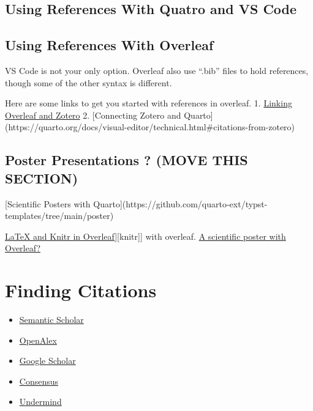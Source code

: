 \documentclass[
  letterpaper,
  DIV=11,
  numbers=noendperiod]{scrreprt}
\providecommand{\tightlist}{%
  \setlength{\itemsep}{0pt}\setlength{\parskip}{0pt}}\usepackage{longtable,booktabs,array}
\begin{document}
\section{Using References With Quatro and VS
Code}\label{using-references-with-quatro-and-vs-code}

\section{Using References With
Overleaf}\label{using-references-with-overleaf}

VS Code is not your only option. Overleaf also use ``.bib'' files to
hold references, though some of the other syntax is different.

Here are some links to get you started with references in overleaf. 1.
\href{https://www.overleaf.com/learn/how-to/How_to_link_your_Overleaf_account_to_Mendeley_and_Zotero}{Linking
Overleaf and Zotero} 2. {[}Connecting Zotero and
Quarto{]}(https://quarto.org/docs/visual-editor/technical.html\#citations-from-zotero)

\section{Poster Presentations ? (MOVE THIS
SECTION)}\label{poster-presentations-move-this-section}

{[}Scientific Posters with
Quarto{]}(https://github.com/quarto-ext/typst-templates/tree/main/poster)

\href{https://www.overleaf.com/learn/latex/Knitr}{LaTeX and Knitr in
Overleaf}{]}{[}knitr{]}{]} with overleaf.
\href{https://www.overleaf.com/latex/templates?q=poster}{A scientific
poster with Overleaf?}


\chapter{Finding Citations}\label{finding-citations}

\begin{itemize}
\tightlist
\item
  \href{https://www.semanticscholar.org/}{Semantic Scholar}
\item
  \href{https://openalex.org/}{OpenAlex}
\item
  \href{https://scholar.google.ca/}{Google Scholar}
\item
  \href{https://consensus.app/}{Consensus}
\item
  \href{https://www.undermind.ai/home/}{Undermind}
\end{itemize}
\end{document}
